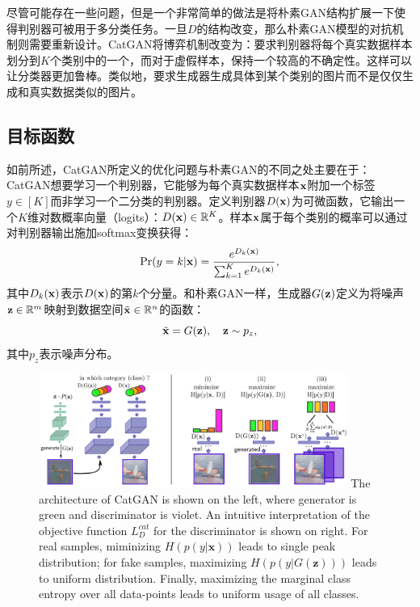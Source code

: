 尽管可能存在一些问题，但是一个非常简单的做法是将朴素GAN结构扩展一下使得判别器可被用于多分类任务。一旦$D$的结构改变，那么朴素GAN模型的对抗机制则需要重新设计。CatGAN将博弈机制改变为：要求判别器将每个真实数据样本划分到$K$个类别中的一个，而对于虚假样本，保持一个较高的不确定性。这样可以让分类器更加鲁棒。类似地，要求生成器生成具体到某个类别的图片而不是仅仅生成和真实数据类似的图片。

\subsection{目标函数}
如前所述，CatGAN所定义的优化问题与朴素GAN的不同之处主要在于：CatGAN想要学习一个判别器，它能够为每个真实数据样本$\mathbf{x}$附加一个标签$y \in [K]$而非学习一个二分类的判别器。定义判别器$D(\mathbf{x})$为可微函数，它输出一个$K$维对数概率向量（logits）：$D(\mathbf{x}) \in \mathbb{R}^K$。样本$\mathbf{x}$属于每个类别的概率可以通过对判别器输出施加softmax变换获得：
\begin{equation}
  \Pr(y=k|\mathbf{x}) = \frac{e^{D_k(\mathbf{x})}}{\sum_{k=1}^K e^{D_k(\mathbf{x})}},
\end{equation}
其中$D_k(\mathbf{x})$表示$D(\mathbf{x})$的第$k$个分量。和朴素GAN一样，生成器$G(\mathbf{z})$定义为将噪声$\mathbf{z} \in \mathbb{R}^m$映射到数据空间$\tilde{\mathbf{x}} \in \mathbb{R}^n$的函数：
\begin{equation}
  \tilde{\mathbf{x}} = G(\mathbf{z}), \quad \mathbf{z} \sim p_z,
\end{equation}
其中$p_z$表示噪声分布。

\begin{figure}[hbtp]
  \centering
  \includegraphics[width=0.9\textwidth]{Img/arch-catgan.png}
  {The architecture of CatGAN is shown on the left, where generator is green and discriminator is violet. An intuitive interpretation of the objective function $L_D^{cat}$ for the discriminator is shown on right. For real samples, miminizing $H(p(y|\mathbf{x}))$ leads to single peak distribution; for fake samples, maximizing $H(p(y|G(\mathbf{z})))$ leads to uniform distribution. Finally, maximizing the marginal class entropy over all data-points leads to uniform usage of all classes.}
  \label{fig:arch-catgan}
\end{figure}

